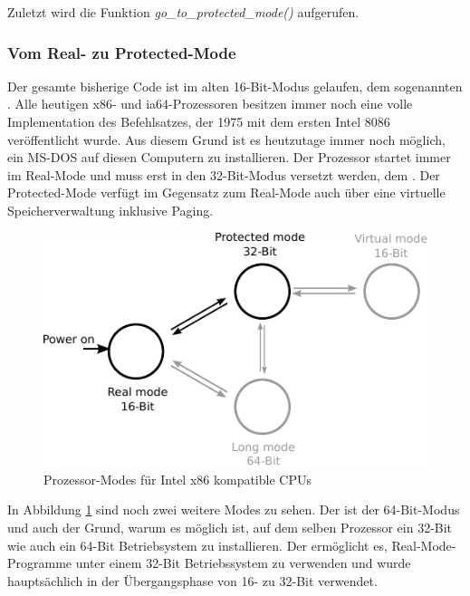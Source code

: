 Zuletzt wird die Funktion \emph{go\_to\_protected\_mode()} aufgerufen.

\subsubsection{Vom Real- zu Protected-Mode}

Der gesamte bisherige Code ist im alten 16-Bit-Modus gelaufen, dem sogenannten . Alle heutigen x86- und ia64-Prozessoren
besitzen immer noch eine volle Implementation des Befehlsatzes, der 1975 mit dem ersten Intel 8086 veröffentlicht wurde. Aus diesem Grund
ist es heutzutage immer noch möglich, ein MS-DOS auf diesen Computern zu installieren. Der Prozessor startet immer im Real-Mode und muss erst
in den 32-Bit-Modus versetzt werden, dem . Der Protected-Mode verfügt im Gegensatz zum Real-Mode auch über eine
virtuelle Speicherverwaltung inklusive Paging. \\

\begin{figure}[h!]
   \begin{center}
      \includegraphics{images/x86modes}
   \end{center}
   \caption{Prozessor-Modes für Intel x86 kompatible CPUs}
   \label{x86modes}
\end{figure}

In Abbildung \ref{x86modes} sind noch zwei weitere Modes zu sehen. Der  ist der 64-Bit-Modus und auch der Grund, warum es
möglich ist, auf dem selben Prozessor ein 32-Bit wie auch ein 64-Bit Betriebsystem zu installieren. Der  ermöglicht 
es, Real-Mode-Programme unter einem 32-Bit Betriebssystem zu verwenden und wurde hauptsächlich in der Übergangsphase von 16- zu 32-Bit verwendet. \\

